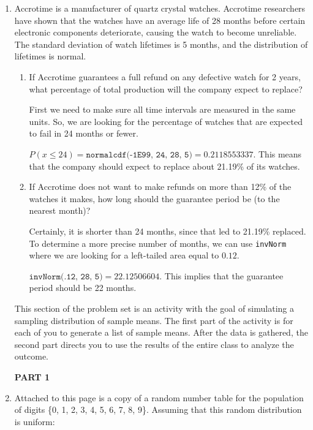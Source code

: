 \documentclass{article}
\newcommand{\answer}[1]{\color{red}#1}
\begin{document}
\begin{enumerate}
\item Accrotime is a manufacturer of quartz crystal watches. Accrotime researchers have shown that the watches have an average life of 28 months before certain electronic components deteriorate, causing the watch to become unreliable.  The standard deviation of watch lifetimes is 5 months, and the distribution of lifetimes is normal.

	\begin{enumerate}
	
	\item If Accrotime guarantees a full refund on any defective watch for 2 years, what percentage of total production will the company expect to replace? 
	
	{\answer First we need to make sure all time intervals are measured in the same units.  So, we are looking for the percentage of watches that are expected to fail in 24 months or fewer. 
	
	$P(x\leq 24) = \texttt{normalcdf(-1E99, 24, 28, 5)} = 0.2118553337$.  This means that the company should expect to replace about 21.19\% of its watches.
	} 

	\item If Accrotime does not want to make refunds on more than 12\% of the watches it makes, how long should the guarantee period be (to the nearest month)? 
	
	{\answer Certainly, it is shorter than 24 months, since that led to 21.19\% replaced.  To determine a more precise number of months, we can use \texttt{invNorm} where we are looking for a left-tailed area equal to $0.12$. 
	
	$\texttt{invNorm(.12, 28, 5)} = 22.12506604$.  This implies that the guarantee period should be 22 months.
	} 

	\end{enumerate}

This section of the problem set is an activity with the goal of simulating a sampling distribution of sample means. The first part of the activity is for each of you to generate a list of sample means. After the data is gathered, the second part directs you to use the results of the entire class to analyze the outcome.

\textbf{PART 1}


\item Attached to this page is a copy of a random number table for the population of digits \{0, 1, 2, 3, 4, 5, 6, 7, 8, 9\}. Assuming that this random distribution is uniform:


\end{enumerate}
\end{document}

